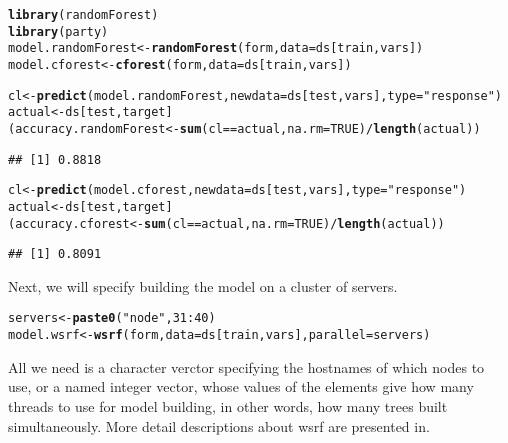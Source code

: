 \documentclass[11pt,a4paper]{article}\usepackage{graphicx, color}
\makeatletter
\newcommand{\hlfunctioncall}[1]{\textcolor[rgb]{0.501960784313725,0,0.329411764705882}{\textbf{#1}}}%
\newcommand{\hlstring}[1]{\textcolor[rgb]{0.6,0.6,1}{#1}}%
\newenvironment{kframe}{%
 \def\at@end@of@kframe{}%
 \ifinner\ifhmode%
  \def\at@end@of@kframe{\end{minipage}}%
  \begin{minipage}{\columnwidth}%
 \fi\fi%
 \def\FrameCommand##1{\hskip\@totalleftmargin \hskip-\fboxsep
 \colorbox{shadecolor}{##1}\hskip-\fboxsep
     \hskip-\linewidth \hskip-\@totalleftmargin \hskip\columnwidth}%
 \MakeFramed {\advance\hsize-\width
   \@totalleftmargin\z@ \linewidth\hsize
   \@setminipage}}%
 {\par\unskip\endMakeFramed%
 \at@end@of@kframe}
\newenvironment{knitrout}{}{} %
\newcommand{\pkg}[1]{{\fontseries{b}\selectfont #1}}
\makeatother
\begin{document}
\begin{knitrout}
\color{fgcolor}\begin{kframe}
\begin{alltt}
\hlfunctioncall{library}(randomForest)
\hlfunctioncall{library}(party)
model.randomForest <- \hlfunctioncall{randomForest}(form, data=ds[train, vars])
model.cforest <- \hlfunctioncall{cforest}(form, data=ds[train, vars])

cl <- \hlfunctioncall{predict}(model.randomForest, newdata=ds[test, vars], type=\hlstring{"response"})
actual <- ds[test, target]
(accuracy.randomForest <- \hlfunctioncall{sum}(cl == actual, na.rm=TRUE)/\hlfunctioncall{length}(actual))
\end{alltt}
\begin{verbatim}
## [1] 0.8818
\end{verbatim}
\begin{alltt}

cl <- \hlfunctioncall{predict}(model.cforest, newdata=ds[test, vars], type=\hlstring{"response"})
actual <- ds[test, target]
(accuracy.cforest <- \hlfunctioncall{sum}(cl == actual, na.rm=TRUE)/\hlfunctioncall{length}(actual))
\end{alltt}
\begin{verbatim}
## [1] 0.8091
\end{verbatim}
\end{kframe}
\end{knitrout}


Next, we will specify building the model on a cluster of servers.

\begin{knitrout}
\color{fgcolor}\begin{kframe}
\begin{alltt}
servers <- \hlfunctioncall{paste0}(\hlstring{"node"}, 31:40)
model.wsrf <- \hlfunctioncall{wsrf}(form, data=ds[train, vars], parallel=servers)
\end{alltt}
\end{kframe}
\end{knitrout}


All we need is a character verctor specifying the hostnames of which
nodes to use, or a named integer vector, whose values of the elements
give how many threads to use for model building, in other words, how
many trees built simultaneously.  More detail descriptions about
\pkg{wsrf} are presented in.




\end{document}
